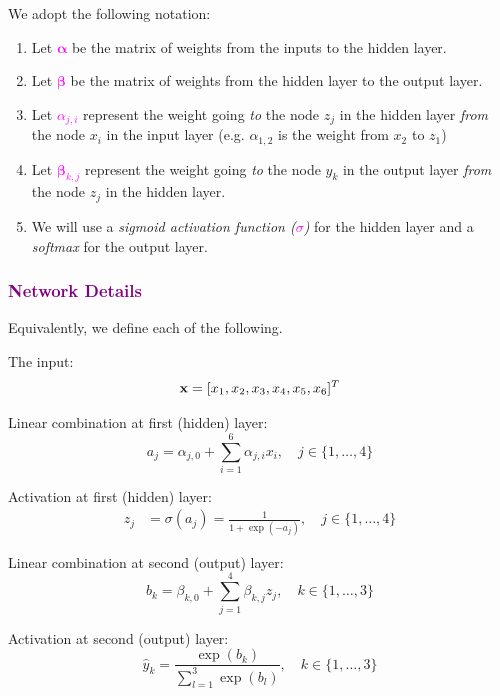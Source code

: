 We adopt the following notation:
\begin{enumerate}
    \item Let \textcolor{magenta}{$\boldsymbol{\alpha}$} be the matrix of weights from the inputs to the hidden layer.
    \item Let \textcolor{magenta}{$\boldsymbol{\beta}$} be the matrix of weights from the hidden layer to the output layer.
    \item Let \textcolor{magenta}{$\alpha_{j,i}$} represent the weight going \textit{to} the node $z_j$ in the hidden layer \textit{from} the node $x_i$ in the input layer (e.g. $\alpha_{1,2}$ is the weight from $x_2$ to $z_1$)
    \item Let \textcolor{magenta}{$\boldsymbol{\beta}_{k,j}$} represent the weight going \textit{to} the node $y_k$ in the output layer \textit{from} the node $z_j$ in the hidden layer.
    \item We will use a \emph{sigmoid activation function (\textcolor{magenta}{$\sigma$})} for the hidden layer and a \emph{softmax} for the output layer. 
\end{enumerate}

\subsubsection*{\textcolor{purple}{Network Details}}
Equivalently, we define each of the following. 

The input:
\begin{align}
\mathbf{x}=[x_1,x_2,x_3,x_4,x_5,x_6]^T
\end{align}

Linear combination at first (hidden) layer:
\begin{equation}
a_j= \alpha_{j,0} + \sum_{i=1}^6 \alpha_{j,i}x_i,\quad j \in \{1,\ldots,4\}
\end{equation}

Activation at first (hidden) layer:
\begin{align}
z_j &= \sigma(a_j) = \frac{1}{1+\exp(-a_j)},\quad  j \in \{1,\ldots,4\}
\end{align}

Linear combination at second (output) layer:
\begin{equation}
b_k = \beta_{k,0} + \sum_{j=1}^4 \beta_{k,j}z_j,\quad  k \in \{1,\ldots,3\}
\end{equation}

Activation at second (output) layer:
\begin{equation}
\hat{y}_k = \frac{\exp(b_k)}{\sum\limits_{l=1}^3 \exp(b_l)},\quad  k \in \{1,\ldots,3\}
\end{equation}

